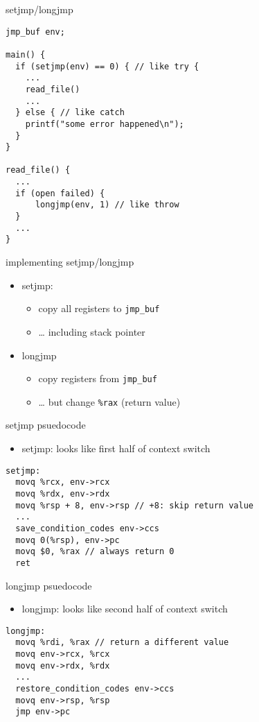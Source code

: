 \begin{frame}[fragile,label=setjmpL]{setjmp/longjmp}
\begin{lstlisting}
jmp_buf env;

main() {
  if (setjmp(env) == 0) { // like try {
    ...
    read_file()
    ...
  } else { // like catch
    printf("some error happened\n");
  }
}

read_file() {
  ...
  if (open failed) {
      longjmp(env, 1) // like throw
  }
  ...
}
\end{lstlisting}
\end{frame}

\begin{frame}{implementing setjmp/longjmp}
\begin{itemize}
\item setjmp:
    \begin{itemize}
    \item copy all registers to {\tt jmp\_buf}
    \item \ldots{} including stack pointer
    \end{itemize}
\item longjmp
    \begin{itemize}
    \item copy registers from {\tt jmp\_buf}
    \item \ldots{} but change {\tt \%rax} (return value)
    \end{itemize}
\end{itemize}
\end{frame}

\begin{frame}[fragile,label=setjmpPseudo]{setjmp psuedocode}
\begin{itemize}
    \item setjmp: looks like first half of context switch
\end{itemize}
\begin{lstlisting}
setjmp:
  movq %rcx, env->rcx
  movq %rdx, env->rdx
  movq %rsp + 8, env->rsp // +8: skip return value
  ...
  save_condition_codes env->ccs
  movq 0(%rsp), env->pc
  movq $0, %rax // always return 0
  ret
\end{lstlisting}
\end{frame}

\begin{frame}[fragile,label=longjmpPseudo]{longjmp psuedocode}
\begin{itemize}
    \item longjmp: looks like second half of context switch
\end{itemize}
\begin{lstlisting}
longjmp:
  movq %rdi, %rax // return a different value
  movq env->rcx, %rcx
  movq env->rdx, %rdx
  ...
  restore_condition_codes env->ccs
  movq env->rsp, %rsp
  jmp env->pc
\end{lstlisting}
\end{frame}

